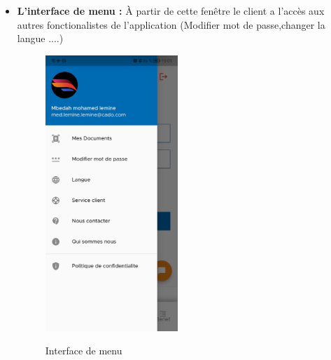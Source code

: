 \begin{itemize}[label=$\ast$]
\newpage
\item \textbf{L’interface de menu
	:} À partir de cette fenêtre le client a l'accès aux autres fonctionalistes de l'application (Modifier mot de passe,changer la langue ....)
\begin{figure}%
	\centering
	{{\includegraphics[width=5cm]{./Template LaTeX/Images/22.jpg} }}%
	\caption{Interface de menu}%
	\label{fig:example}%
\end{figure}
\end{itemize}

